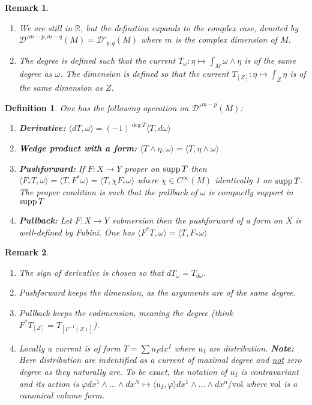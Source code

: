 \documentclass[11pt]{article}
\newtheorem{remark}{Remark}
\newtheorem{definition}{Definition}
\newcommand{\supp}{\mathop{\rm supp}\nolimits}
\begin{document}
\begin{remark}
\begin{enumerate}
\item We are still in \(\mathbb{R}\), but the definition expands to the complex case,
denoted by \(\mathcal{D}'^{m-p, m-q}(M) = \mathcal{D}'_{p,q}(M)\) where \(m\) is
the complex dimension of \(M\).
\item The degree is defined such that the current \(T_\omega: \eta \mapsto \int_M
   \omega\wedge\eta\) is of the same degree as \(\omega\). The dimension is defined so
that the current \(T_{[Z]}: \eta \mapsto \int_Z \eta\) is of the same dimension as \(Z\).
\end{enumerate}
\end{remark}

\begin{definition}
One has the following operation on \(\mathcal{D}'^{m-p}(M)\):
\begin{enumerate}
\item \textbf{Derivative:} \(\langle dT, \omega \rangle  = (-1)^{\deg{T}} \langle T, d\omega \rangle\)
\item \textbf{Wedge product with a form:} \(\langle T\wedge \eta,\omega \rangle  = \langle T, \eta \wedge
   \omega \rangle\)
\item \textbf{Pushforward:} If \(F: X \longrightarrow Y\) proper on \(\supp T\) then \(\langle
   F_*T, \omega \rangle = \langle T, F^*\omega \rangle = \langle T, \chi F_* \omega
   \rangle\) where \(\chi \in C^{\infty}(M)\) identically 1 on \(\supp T\). The
proper condition is such that the pullback of \(\omega\) is compactly support in \(\supp T\)
\item \textbf{Pullback:} Let \(F: X \longrightarrow Y\) submersion then the pushforward of a form
on \(X\) is well-defined by Fubini. One has \(\langle F^* T, \omega \rangle =
   \langle T, F_* \omega \rangle\)
\end{enumerate}
\end{definition}

\begin{remark}
\begin{enumerate}
\item The sign of derivative is chosen so that \(dT_\omega = T_{d\omega}\).
\item Pushforward keeps the dimension, as the arguments are of the same degree.
\item Pullback keeps the codimension, meaning the degree (think \(F^* T_{[Z]} =
   T_{[F^{-1}(Z)]}\)).
\item Locally a current is of form \(T = \sum u_I dx^I\) where \(u_I\) are
distribution. \textbf{Note:} Here distribution are indentified as a current of maximal degree
and \uline{not} zero degree as they naturally are. To be exact, the notation of \(u_I\) is
contravariant and its action is \(\varphi dx^1\wedge\dots\wedge dx^N \mapsto \langle
   u_I, \varphi \rangle dx^1\wedge\dots\wedge dx^n/\text{vol}\) where \(\text{vol}\) is
a canonical volume form.
\end{enumerate}
\end{remark}
\end{document}
